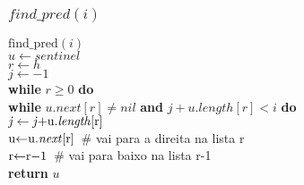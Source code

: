 \documentclass{beamer}
\begin{document}
\begin{frame}
\frametitle{$find\_pred(i)$}
\begin{oframed}
\begin{flushleft}
\hspace*{1em} \ensuremath{\mathrm{find\_pred}(\ensuremath{\mathit{i}})}\\
\hspace*{1em} \hspace*{1em} \ensuremath{\ensuremath{\mathit{u}} \gets  \ensuremath{sentinel}}\\
\hspace*{1em} \hspace*{1em} \ensuremath{\ensuremath{\mathit{r}} \gets  \ensuremath{h}}\\
\hspace*{1em} \hspace*{1em} \ensuremath{\ensuremath{\mathit{j}} \gets  \ensuremath{-1}}\\
\hspace*{1em} \hspace*{1em} {\color{black} \textbf{while}} \ensuremath{\ensuremath{\mathit{r}} \ge 0} {\color{black} \textbf{do}} \\
\hspace*{1em} \hspace*{1em} \hspace*{1em} {\color{black} \textbf{while}} \ensuremath{\ensuremath{\mathit{u}}.\ensuremath{\mathit{next}}[\ensuremath{\mathit{r}}] \ne nil} {\color{black} \textbf{and}} \ensuremath{\ensuremath{\mathit{j}} + \ensuremath{\mathit{u}}.\ensuremath{\mathit{length}}[\ensuremath{\mathit{r}}] < i} {\color{black} \textbf{do}} \\
\hspace*{1em} \hspace*{1em} \hspace*{1em} \hspace*{1em} \ensuremath{\ensuremath{\mathit{j}} \gets  \ensuremath{\ensuremath{\mathit{j}} + $u$.\ensuremath{\mathit{length}}[$r$]}}\\
\hspace*{1em} \hspace*{1em} \hspace*{1em} \hspace*{1em} \ensuremath{$u$ \gets  \ensuremath{$u$.\ensuremath{\mathit{next}}[$r$]}  }\ {\color{blue}\# vai para a direita na lista r}\\
\hspace*{1em} \hspace*{1em} \hspace*{1em} \ensuremath{$r$ \gets  \ensuremath{$r$ - 1}  }\ {\color{blue}\# vai para baixo na lista r-1}\\
\hspace*{1em} \hspace*{1em} {\color{black} \textbf{return}} \ensuremath{\ensuremath{\mathit{u}}}\\
\end{flushleft}
\end{oframed}
\end{frame}
\end{document}
